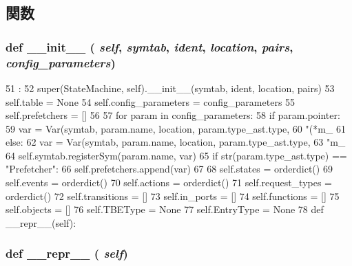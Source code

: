 \subsection{関数}
\hypertarget{classslicc_1_1symbols_1_1StateMachine_1_1StateMachine_ac775ee34451fdfa742b318538164070e}{
\subsubsection[{\_\-\_\-init\_\-\_\-}]{\setlength{\rightskip}{0pt plus 5cm}def \_\-\_\-init\_\-\_\- ( {\em self}, \/   {\em symtab}, \/   {\em ident}, \/   {\em location}, \/   {\em pairs}, \/   {\em config\_\-parameters})}}
\label{classslicc_1_1symbols_1_1StateMachine_1_1StateMachine_ac775ee34451fdfa742b318538164070e}



\begin{DoxyCode}
51                                                                          :
52         super(StateMachine, self).__init__(symtab, ident, location, pairs)
53         self.table = None
54         self.config_parameters = config_parameters
55         self.prefetchers = []
56 
57         for param in config_parameters:
58             if param.pointer:
59                 var = Var(symtab, param.name, location, param.type_ast.type,
60                           "(*m_%
61             else:
62                 var = Var(symtab, param.name, location, param.type_ast.type,
63                           "m_%
64             self.symtab.registerSym(param.name, var)
65             if str(param.type_ast.type) == "Prefetcher":
66                 self.prefetchers.append(var)
67 
68         self.states = orderdict()
69         self.events = orderdict()
70         self.actions = orderdict()
71         self.request_types = orderdict()
72         self.transitions = []
73         self.in_ports = []
74         self.functions = []
75         self.objects = []
76         self.TBEType   = None
77         self.EntryType = None
78 
    def __repr__(self):
\end{DoxyCode}
\hypertarget{classslicc_1_1symbols_1_1StateMachine_1_1StateMachine_ad8b9328939df072e4740cd9a63189744}{
\subsubsection[{\_\-\_\-repr\_\-\_\-}]{\setlength{\rightskip}{0pt plus 5cm}def \_\-\_\-repr\_\-\_\- ( {\em self})}}
\label{classslicc_1_1symbols_1_1StateMachine_1_1StateMachine_ad8b9328939df072e4740cd9a63189744}


